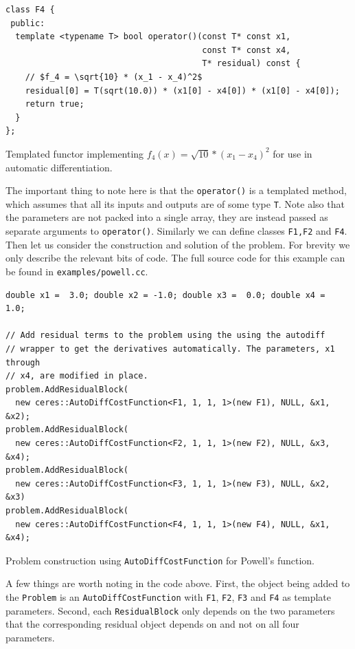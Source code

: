 \begin{listing}[H]
\begin{verbatim}
class F4 {
 public:
  template <typename T> bool operator()(const T* const x1,
                                        const T* const x4,
                                        T* residual) const {
    // $f_4 = \sqrt{10} * (x_1 - x_4)^2$
    residual[0] = T(sqrt(10.0)) * (x1[0] - x4[0]) * (x1[0] - x4[0]);
    return true;
  }
};
\end{verbatim}
\caption{Templated functor implementing $f_4(x) = \sqrt{10} * (x_1 - x_4)^2$ for use in automatic differentiation.}
\label{listing:f4functor}
\end{listing}

The important thing to note here is that the \texttt{operator()} is a
templated method, which assumes that all its inputs and outputs are of
some type \texttt{T}.  Note also that the parameters are not packed
into a single array, they are instead passed as separate arguments to
\texttt{operator()}. Similarly we can define classes \texttt{F1,F2}
and \texttt{F4}. Then let us consider the construction and solution of the problem. For brevity we only describe the relevant bits of code. The full source code for this example can be found in \texttt{examples/powell.cc}.

\begin{listing}[H]
\begin{verbatim}
double x1 =  3.0; double x2 = -1.0; double x3 =  0.0; double x4 =  1.0;

// Add residual terms to the problem using the using the autodiff
// wrapper to get the derivatives automatically. The parameters, x1 through
// x4, are modified in place.
problem.AddResidualBlock(
  new ceres::AutoDiffCostFunction<F1, 1, 1, 1>(new F1), NULL, &x1, &x2);
problem.AddResidualBlock(
  new ceres::AutoDiffCostFunction<F2, 1, 1, 1>(new F2), NULL, &x3, &x4);
problem.AddResidualBlock(
  new ceres::AutoDiffCostFunction<F3, 1, 1, 1>(new F3), NULL, &x2, &x3)
problem.AddResidualBlock(
  new ceres::AutoDiffCostFunction<F4, 1, 1, 1>(new F4), NULL, &x1, &x4);
\end{verbatim}
\caption{Problem construction using \texttt{AutoDiffCostFunction} for Powell's function.}
\label{listing:powell}
\end{listing}
A few things are worth noting in the code above. First, the object
being added to the \texttt{Problem} is an
\texttt{AutoDiffCostFunction} with \texttt{F1}, \texttt{F2}, \texttt{F3} and \texttt{F4} as template parameters. Second, each \texttt{ResidualBlock} only depends on the two parameters that the corresponding residual object depends on and not on all four parameters.


